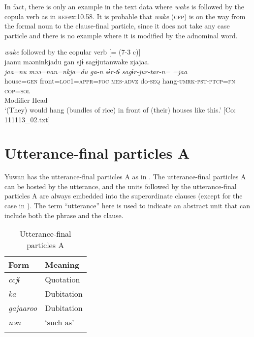 In fact, there is only an example in the text data where \textit{wake} is followed by the copula verb as in \textsc{ref}{ex:10.58}. It is probable that \textit{wake} (\textsc{cfp}) is on the way from the formal noun to the clause-final particle, since it does not take any case particle and there is no example where it is modified by the adnominal word.

\ea\label{ex:10.58}   \textit{wake} followed by the copular verb [= (7-3 c)]\\
      \gllll    jaanu  məəninkjadu  gan  sjɨ   sagɨjutanwake  zjajaa.\\
    \textit{jaa=nu}  \textit{məə=nan=nkja=du}  \textit{ga-n}  \textit{sɨr-tɨ} \textit{sagɨr-jur-tar-n=}  \textit{=jaa}\\
    house=\textsc{gen}  front=\textsc{loc}1=\textsc{appr}=\textsc{foc}  \textsc{mes}-\textsc{advz}  do-\textsc{seq}  hang-\textsc{umrk}-\textsc{pst}-\textsc{ptcp}=\textsc{fn}  \textsc{cop}=\textsc{sol}\\
    Modifier  Head\\
    \glt  ‘(They) would hang (bundles of rice) in front of (their) houses like this.’ [Co: 111113\_02.txt]
\z

\section{Utterance-final particles A}\label{sec:10.4}

Yuwan has the utterance-final particles A as in . The utterance-final particles A can be hosted by the utterance, and the units followed by the utterance-final particles A are always embedded into the superordinate clauses (except for the case in ). The term “utterance” here is used to indicate an abstract unit that can include both the phrase and the clause.

\begin{table}
\caption{Utterance-final particles A\label{tab:100}}
\begin{tabular}{ll}
\lsptoprule
Form & Meaning\\\midrule
\textit{ccjɨ}     & Quotation \\
\textit{ka}       & Dubitation\\
\textit{gajaaroo} & Dubitation\\
\textit{nən}      & ‘such as’ \\
\lspbottomrule
\end{tabular}
\end{table}

